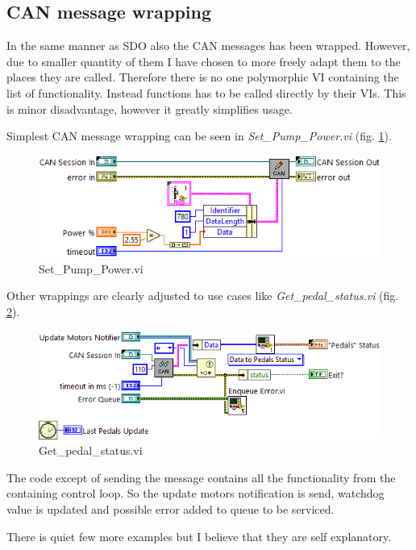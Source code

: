 \subsection{CAN message wrapping}
In the same manner as SDO also the CAN messages has been wrapped. However, due to smaller quantity of them I have chosen to more freely adapt them to the places they are called. Therefore there is no one polymorphic VI containing the list of functionality.
Instead functions has to be called directly by their VIs. This is minor disadvantage, however it greatly simplifies usage.

Simplest CAN message wrapping can be seen in \textit{Set\_Pump\_Power.vi} (fig. \ref{vi:Set_Pump_Power}).
\begin{figure}[H]
    \centering
    \includegraphics[scale=\visc,max width=\textwidth]{figures/Set_Pump_Powerd}
    \caption{Set\_Pump\_Power.vi}
    \label{vi:Set_Pump_Power}
\end{figure}

Other wrappings are clearly adjusted to use cases like \textit{Get\_pedal\_status.vi} (fig. \ref{vi:Get_pedal_status}).
\begin{figure}[H]
    \centering
    \includegraphics[scale=\visc,max width=\textwidth]{figures/Get_pedal_statusd}
    \caption{Get\_pedal\_status.vi}
    \label{vi:Get_pedal_status}
\end{figure}
The code except of sending the message contains all the functionality from the containing control loop. So the update motors notification is send, watchdog value is updated and possible error added to queue to be serviced.

There is quiet few more examples but I believe that they are self explanatory.

